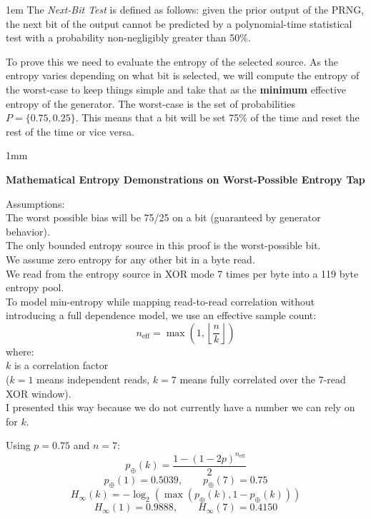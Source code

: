 \documentclass[titlepage]{report}
\renewcommand{\qed}{}
\renewenvironment{proof}{\begin{mdframed}[backgroundcolor=ltgray]\begin{addmargin}[1mm]{1mm}\footnotesize\begin{newproof}}{\end{newproof}\end{addmargin}\end{mdframed}\qed}
\begin{document}
	\begin{addmargin}[1em]{1em}
		The \textit{Next-Bit Test} is defined as follows: given the prior output of the PRNG, the next bit of the output cannot be predicted by a polynomial-time statistical test with a probability non-negligibly greater than 50\%.
		
		To prove this we need to evaluate the entropy of the selected source. As the entropy varies depending on what bit is selected, we will compute the entropy of the worst-case to keep things simple and take that as the \textbf{minimum} effective entropy of the generator. The worst-case is the set of probabilities $P = \{0.75, 0.25\}$. This means that a bit will be set 75\% of the time and reset the rest of the time or vice versa.\\
		
		\begin{proof}
			\textbf{Mathematical Entropy Demonstrations on Worst-Possible Entropy Tap}
			
			Assumptions:\\
			The worst possible bias will be 75/25 on a bit (guaranteed by generator behavior).\\
			The only bounded entropy source in this proof is the worst-possible bit.\\
			We assume zero entropy for any other bit in a byte read.\\
			We read from the entropy source in XOR mode 7 times per byte into a 119 byte entropy pool.\\
			
			To model min-entropy while mapping read-to-read correlation without introducing a full dependence model, we use an effective sample count:
			\[
			n_{\text{eff}}=\max\!\left(1,\left\lfloor\frac{n}{k}\right\rfloor\right)
			\]
			where:\\
			$k$ is a correlation factor\\
			($k=1$ means independent reads, $k=7$ means fully correlated over the 7-read XOR window).\\
			I presented this way because we do not currently have a number we can rely on for $k$.
			
			Using $p=0.75$ and $n=7$:
			\[
			p_{\oplus}(k)=\frac{1-(1-2p)^{n_{\text{eff}}}}{2}
			\]
			\[
			p_{\oplus}(1)=0.5039,\qquad p_{\oplus}(7)=0.75
			\]
			\[
			H_{\infty}(k)=-\log_2\!\left(\max\!\left(p_{\oplus}(k),1-p_{\oplus}(k)\right)\right)
			\]
			\[
			H_{\infty}(1)=0.9888,\qquad H_{\infty}(7)=0.4150
			\]
			

\end{proof}
\end{addmargin}
\end{document}
